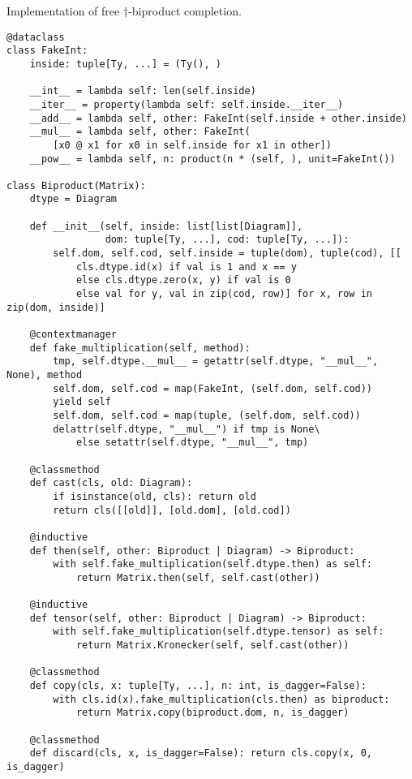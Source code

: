 \begin{python}
{\normalfont Implementation of free $\dagger$-biproduct completion.}

\begin{verbatim}
@dataclass
class FakeInt:
    inside: tuple[Ty, ...] = (Ty(), )

    __int__ = lambda self: len(self.inside)
    __iter__ = property(lambda self: self.inside.__iter__)
    __add__ = lambda self, other: FakeInt(self.inside + other.inside)
    __mul__ = lambda self, other: FakeInt(
        [x0 @ x1 for x0 in self.inside for x1 in other])
    __pow__ = lambda self, n: product(n * (self, ), unit=FakeInt())

class Biproduct(Matrix):
    dtype = Diagram

    def __init__(self, inside: list[list[Diagram]],
                 dom: tuple[Ty, ...], cod: tuple[Ty, ...]):
        self.dom, self.cod, self.inside = tuple(dom), tuple(cod), [[
            cls.dtype.id(x) if val is 1 and x == y
            else cls.dtype.zero(x, y) if val is 0
            else val for y, val in zip(cod, row)] for x, row in zip(dom, inside)]

    @contextmanager
    def fake_multiplication(self, method):
        tmp, self.dtype.__mul__ = getattr(self.dtype, "__mul__", None), method
        self.dom, self.cod = map(FakeInt, (self.dom, self.cod))
        yield self
        self.dom, self.cod = map(tuple, (self.dom, self.cod))
        delattr(self.dtype, "__mul__") if tmp is None\
            else setattr(self.dtype, "__mul__", tmp)

    @classmethod
    def cast(cls, old: Diagram):
        if isinstance(old, cls): return old
        return cls([[old]], [old.dom], [old.cod])

    @inductive
    def then(self, other: Biproduct | Diagram) -> Biproduct:
        with self.fake_multiplication(self.dtype.then) as self:
            return Matrix.then(self, self.cast(other))

    @inductive
    def tensor(self, other: Biproduct | Diagram) -> Biproduct:
        with self.fake_multiplication(self.dtype.tensor) as self:
            return Matrix.Kronecker(self, self.cast(other))

    @classmethod
    def copy(cls, x: tuple[Ty, ...], n: int, is_dagger=False):
        with cls.id(x).fake_multiplication(cls.then) as biproduct:
            return Matrix.copy(biproduct.dom, n, is_dagger)

    @classmethod
    def discard(cls, x, is_dagger=False): return cls.copy(x, 0, is_dagger)


\end{verbatim}
\end{python}
